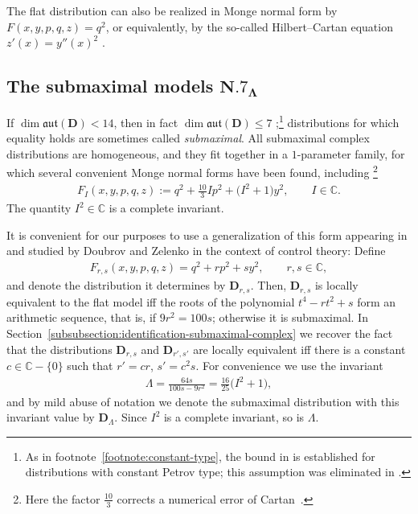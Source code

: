 \documentclass[10pt,a4paper]{amsart}
\newcommand{\bbC}{\mathbb{C}}
\newcommand{\mbD}{\mathbf{D}}
\newcommand{\mfaut}{\mathfrak{aut}}
\numberwithin{equation}{section}
\begin{document}
The flat distribution can also be realized in Monge normal form by $F(x, y, p, q, z) = q^2$, or equivalently, by the so-called Hilbert--Cartan equation $z'(x) = y''(x)^2$ \cite{CartanCurves, Hilbert}.

\subsection[The submaximal models $\mathbf{N.7}_\Lambda$]{The submaximal models $\boldsymbol{\mathbf{N.7}_\Lambda}$}\label{subsection:N.7}
If $\dim \mfaut(\mbD) < 14$, then in fact $\dim \mfaut(\mbD) \leq 7$ \cite{CartanFiveVariables, KruglikovThe};\footnote{As in footnote~\ref{footnote:constant-type}, the bound in \cite{CartanFiveVariables} is established for distributions with constant Petrov type; this assumption was eliminated in \cite{KruglikovThe}.} distributions for which equality holds are sometimes called \textit{submaximal}. All submaximal complex distributions are homogeneous, and they fit together in a $1$-parameter family, for which several convenient Monge normal forms have been found, including \cite[Section~45]{CartanFiveVariables}\footnote{Here the factor $\frac{10}{3}$ corrects a numerical error of Cartan~\cite{Strazzullo}.}
\begin{gather*}
	F_I(x, y, p, q, z) := q^2 + \tfrac{10}{3} I p^2 + \big(I^2 + 1\big) y^2 , \qquad I \in \bbC .
\end{gather*}
The quantity $I^2 \in \bbC$ is a complete invariant.

It is convenient for our purposes to use a generalization of this form appearing in \cite[Section~4]{CartanFiveVariables} and studied by Doubrov and Zelenko in the context of control theory: Define \cite{DoubrovZelenko}
\begin{gather*}
	F_{r, s}(x, y, p, q, z) = q^2 + r p^2 + s y^2, \qquad r, s \in \bbC ,
\end{gather*}
and denote the distribution it determines by $\mbD_{r, s}$. Then, $\mbD_{r, s}$ is locally equivalent to the flat model iff the roots of the polynomial $t^4 - r t^2 + s$ form an arithmetic sequence, that is, if $9 r^2 = 100 s$; otherwise it is submaximal. In Section~\ref{subsubsection:identification-submaximal-complex} we recover the fact that the distributions $\mbD_{r, s}$ and $\mbD_{r', s'}$ are locally equivalent iff there is a constant $c \in \bbC - \{ 0 \}$ such that $r' = c r$, $s' = c^2 s$. For convenience we use the invariant
\begin{gather*}
 \Lambda = \frac{64 s}{100 s - 9 r^2} = \frac{16}{25} \big(I^2 + 1\big) ,
\end{gather*}
and by mild abuse of notation we denote the submaximal distribution with this invariant value by $\mbD_\Lambda$. Since $I^2$ is a complete invariant, so is $\Lambda$.
\end{document}
